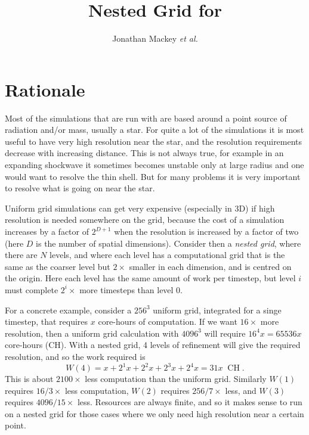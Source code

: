 \documentclass[a4paper,11pt]{article}
\title{Nested Grid for \pion{}}
\author{Jonathan Mackey \textit{et al.}}
\begin{document}
\maketitle

\section{Rationale}
Most of the simulations that are run with \pion{} are based around a point source of radiation and/or mass, usually a star.
For quite a lot of the simulations it is most useful to have very high resolution near the star, and the resolution requirements decrease with increasing distance.
This is not always true, for example in an expanding shockwave it sometimes becomes unstable only at large radius and one would want to resolve the thin shell.
But for many problems it is very important to resolve what is going on near the star.

Uniform grid simulations can get very expensive (especially in 3D) if high resolution is needed somewhere on the grid, because the cost of a simulation increases by a factor of $2^{D+1}$ when the resolution is increased by a factor of two (here $D$ is the number of spatial dimensions).
Consider then a \textit{nested grid}, where there are $N$ levels, and where each level has a computational grid that is the same as the coarser level but $2\times$ smaller in each dimension, and is centred on the origin.
Here each level has the same amount of work per timestep, but level $i$ must complete $2^i\times$ more timesteps than level 0.

For a concrete example, consider a $256^3$ uniform grid, integrated for a singe timestep, that requires $x$ core-hours of computation.
If we want $16\times$ more resolution, then a uniform grid calculation with $4096^3$ will require $16^4x = 65536x$ core-hours (CH).
With a nested grid, 4 levels of refinement will give the required resolution, and so the work required is
\begin{equation}
W(4) = x + 2^1x + 2^2x + 2^3x + 2^4x = 31x \;\; \mathrm{CH}\;.
\end{equation}
This is about $2100\times$ less computation than the uniform grid.
Similarly $W(1)$ requires $16/3\times$ less computation, $W(2)$ requires $256/7\times$ less, and $W(3)$ requires $4096/15\times$ less.
Resources are always finite, and so it makes sense to run on a nested grid for those cases where we only need high resolution near a certain point.
\end{document}
